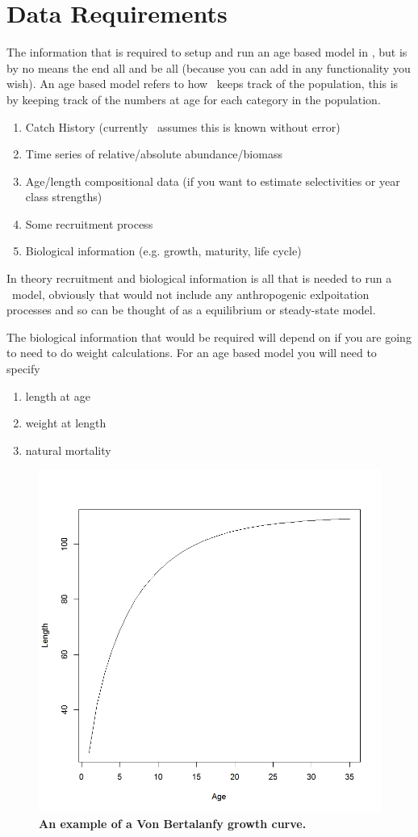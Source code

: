 \section{Data Requirements}\label{sec:data_requirements}
The information that is required to setup and run an age based model in \CNAME, but is by no means the end all and be all (because you can add in any functionality you wish). An age based model refers to how \CNAME\ keeps track of the population, this is by keeping track of the numbers at age for each category in the population.
\begin{enumerate}
	\item Catch History (currently \CNAME\ assumes this is known without error)
	\item Time series of relative/absolute abundance/biomass
	\item Age/length compositional data (if you want to estimate selectivities or year class strengths)
	\item Some recruitment process
	\item Biological information (e.g. growth, maturity, life cycle)
\end{enumerate}
In theory recruitment and biological information is all that is needed to run a \CNAME\ model, obviously that would not include any anthropogenic exlpoitation processes and so can be thought of as a equilibrium or steady-state model.

The biological information that would be required will depend on if you are going to need to do weight calculations. For an age based model you will need to specify 
\begin{enumerate}
	\item length at age 
	\item weight at length 
	\item natural mortality 	
\end{enumerate}

\begin{figure}[htp]
			 \includegraphics[scale=0.4]{Figures/VonBert.jpeg}
			 \caption{\textbf{An example of a Von Bertalanfy growth curve.}}
\end{figure}



